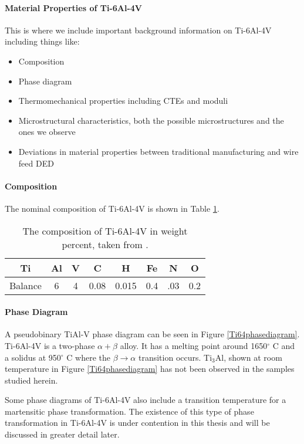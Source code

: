 \paragraph{Material Properties of Ti-6Al-4V}
This is where we include important background information on Ti-6Al-4V including things like:
\begin{itemize}
	\item Composition
	\item Phase diagram
	\item Thermomechanical properties including CTEs and moduli
	\item Microstructural characteristics, both the possible microstructures and the ones we observe
	\item Deviations in material properties between traditional manufacturing and wire feed DED
\end{itemize}

\paragraph{Composition}
The nominal composition of Ti-6Al-4V is shown in Table \ref{Ti64_comp}.
\begin{table} \caption{The composition of Ti-6Al-4V in weight percent, taken from \cite{Ti64matweb}.} \label{Ti64_comp}
	\begin{center}
		\begin{tabular}{cccccccc}\hline
		Ti & Al & V & C & H & Fe & N & O\\ \hline
		Balance & 6 & 4 & 0.08 & 0.015 & 0.4 & .03 & 0.2 \\
		\end{tabular}
	\end{center}
\end{table}
			

\paragraph{Phase Diagram}
A pseudobinary TiAl-V phase diagram can be seen in Figure \ref{Ti64phasediagram}. Ti-6Al-4V is a two-phase $\alpha + \beta$ alloy. It has a melting point around 1650$^\circ$ C and a solidus at 950$^\circ$ C where the $\beta \to \alpha$ transition occurs. Ti$_3$Al, shown at room temperature in Figure \ref{Ti64phasediagram} has not been observed in the samples studied herein. 

Some phase diagrams of Ti-6Al-4V also include a transition temperature for a martensitic phase transformation. The existence of this type of phase transformation in Ti-6Al-4V is under contention in this thesis and will be discussed in greater detail later.

